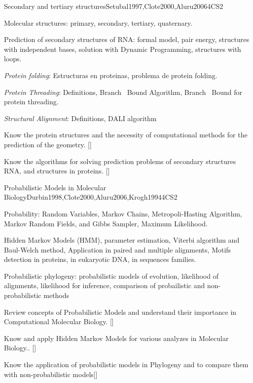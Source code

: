 \begin{syllabus}
\begin{unit}{Secondary and tertiary structures}{}{Setubal1997,Clote2000,Aluru2006}{4}{CS2}
   \begin{topics}
    \item Molecular structures: primary, secondary, tertiary, quaternary.
    \item Prediction of secondary structures of RNA: formal model, pair energy, structures with independent bases, solution with Dynamic Programming, structures with loops.
    \item {\it Protein folding}: Estructuras en proteinas, problema de protein folding.
    \item {\it Protein Threading}: Definitions, Branch \ Bound Algorithm, Branch \ Bound for protein threading.
    \item {\it Structural Alignment}: Definitions, DALI algorithm
   \end{topics}
   \begin{learningoutcomes}
     \item Know the protein structures and the necessity of computational methods for the prediction of the geometry. [\Familiarity]
	   \item Know the algorithms for solving prediction problems of secondary structures RNA, and structures in proteins. [\Assessment]
   \end{learningoutcomes}
\end{unit}

\begin{unit}{Probabilistic Models in Molecular Biology}{}{Durbin1998,Clote2000,Aluru2006,Krogh1994}{4}{CS2}
   \begin{topics}
    \item Probability: Random Variables, Markov Chains, Metropoli-Hasting Algorithm, Markov Random Fields, and Gibbs Sampler, Maximum Likelihood.
    \item Hidden Markov Models (HMM),  parameter estimation, Viterbi algorithm and Baul-Welch method, Application in paired and multiple alignments, Motifs detection in proteins, in eukaryotic DNA, in sequences families.
		\item Probabilistic phylogeny: probabilistic models of evolution, likelihood of alignments, likelihood for inference, comparison of probailistic and non-probabilistic methods
   \end{topics}
   \begin{learningoutcomes}
      \item  Review concepts of Probabilistic Models and understand their importance in Computational Molecular Biology. [\Assessment]
	  \item Know and apply Hidden Markov Models for various analyzes in Molecular Biology.. [\Usage]
		\item Know the application of probabilistic models in Phylogeny and to compare them with non-probabilistic models[\Assessment]
   \end{learningoutcomes}
\end{unit}

\begin{coursebibliography}
\end{coursebibliography}

\end{syllabus}
